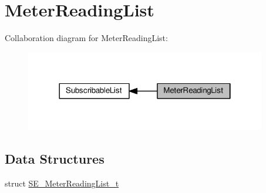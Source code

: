\hypertarget{group__MeterReadingList}{}\section{Meter\+Reading\+List}
\label{group__MeterReadingList}
Collaboration diagram for Meter\+Reading\+List\+:\nopagebreak
\begin{figure}[H]
\begin{center}
\leavevmode
\includegraphics[width=298pt]{group__MeterReadingList}
\end{center}
\end{figure}
\subsection*{Data Structures}
\begin{DoxyCompactItemize}
\item 
struct \hyperlink{structSE__MeterReadingList__t}{S\+E\+\_\+\+Meter\+Reading\+List\+\_\+t}
\end{DoxyCompactItemize}
